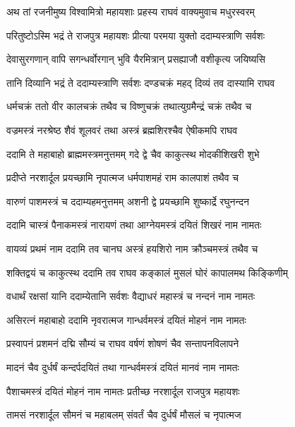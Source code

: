
\twolineshloka
{अथ तां रजनीमुष्य विश्वामित्रो महायशाः}
{प्रहस्य राघवं वाक्यमुवाच मधुरस्वरम्} %

\twolineshloka
{परितुष्टोऽस्मि भद्रं ते राजपुत्र महायशः}
{प्रीत्या परमया युक्तो ददाम्यस्त्राणि सर्वशः} %

\twolineshloka
{देवासुरगणान् वापि सगन्धर्वोरगान् भुवि}
{यैरमित्रान् प्रसह्याजौ वशीकृत्य जयिष्यसि} %

\twolineshloka
{तानि दिव्यानि भद्रं ते ददाम्यस्त्राणि सर्वशः}
{दण्डचक्रं महद् दिव्यं तव दास्यामि राघव} %

\twolineshloka
{धर्मचक्रं ततो वीर कालचक्रं तथैव च}
{विष्णुचक्रं तथात्युग्रमैन्द्रं चक्रं तथैव च} %

\twolineshloka
{वज्रमस्त्रं नरश्रेष्ठ शैवं शूलवरं तथा}
{अस्त्रं ब्रह्मशिरश्चैव ऐषीकमपि राघव} %

\twolineshloka
{ददामि ते महाबाहो ब्राह्ममस्त्रमनुत्तमम्}
{गदे द्वे चैव काकुत्स्थ मोदकीशिखरी शुभे} %

\twolineshloka
{प्रदीप्ते नरशार्दूल प्रयच्छामि नृपात्मज}
{धर्मपाशमहं राम कालपाशं तथैव च} %

\twolineshloka
{वारुणं पाशमस्त्रं च ददाम्यहमनुत्तमम्}
{अशनी द्वे प्रयच्छामि शुष्कार्द्रे रघुनन्दन} %

\twolineshloka
{ददामि चास्त्रं पैनाकमस्त्रं नारायणं तथा}
{आग्नेयमस्त्रं दयितं शिखरं नाम नामतः} %

\twolineshloka
{वायव्यं प्रथमं नाम ददामि तव चानघ}
{अस्त्रं हयशिरो नाम क्रौञ्चमस्त्रं तथैव च} %

\twolineshloka
{शक्तिद्वयं च काकुत्स्थ ददामि तव राघव}
{कङ्कालं मुसलं घोरं कापालमथ किङ्किणीम्} %

\twolineshloka
{वधार्थं रक्षसां यानि ददाम्येतानि सर्वशः}
{वैद्याधरं महास्त्रं च नन्दनं नाम नामतः} %

\twolineshloka
{असिरत्नं महाबाहो ददामि नृवरात्मज}
{गान्धर्वमस्त्रं दयितं मोहनं नाम नामतः} %

\twolineshloka
{प्रस्वापनं प्रशमनं दद्मि सौम्यं च राघव}
{वर्षणं शोषणं चैव सन्तापनविलापने} %

\twolineshloka
{मादनं चैव दुर्धर्षं कन्दर्पदयितं तथा}
{गान्धर्वमस्त्रं दयितं मानवं नाम नामतः} %

\twolineshloka
{पैशाचमस्त्रं दयितं मोहनं नाम नामतः}
{प्रतीच्छ नरशार्दूल राजपुत्र महायशः} %

\twolineshloka
{तामसं नरशार्दूल सौमनं च महाबलम्}
{संवर्तं चैव दुर्धर्षं मौसलं च नृपात्मज} %

